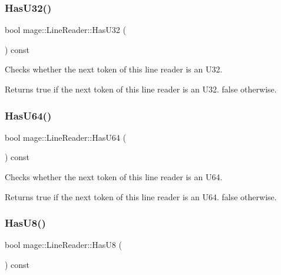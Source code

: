 \subsubsection{\texorpdfstring{Has\+U32()}{HasU32()}}
{\footnotesize\ttfamily bool mage\+::\+Line\+Reader\+::\+Has\+U32 (\begin{DoxyParamCaption}{ }\end{DoxyParamCaption}) const\hspace{0.3cm}{\ttfamily [protected]}}

Checks whether the next token of this line reader is an {\ttfamily U32}.

\begin{DoxyReturn}{Returns}
{\ttfamily true} if the next token of this line reader is an {\ttfamily U32}. {\ttfamily false} otherwise. 
\end{DoxyReturn}
\hypertarget{classmage_1_1_line_reader_a638e055df8a1850e2e5cb9c91f8c54fc}{}\label{classmage_1_1_line_reader_a638e055df8a1850e2e5cb9c91f8c54fc} 
\subsubsection{\texorpdfstring{Has\+U64()}{HasU64()}}
{\footnotesize\ttfamily bool mage\+::\+Line\+Reader\+::\+Has\+U64 (\begin{DoxyParamCaption}{ }\end{DoxyParamCaption}) const\hspace{0.3cm}{\ttfamily [protected]}}

Checks whether the next token of this line reader is an {\ttfamily U64}.

\begin{DoxyReturn}{Returns}
{\ttfamily true} if the next token of this line reader is an {\ttfamily U64}. {\ttfamily false} otherwise. 
\end{DoxyReturn}
\hypertarget{classmage_1_1_line_reader_a2366e6732f404890a54573fd009530aa}{}\label{classmage_1_1_line_reader_a2366e6732f404890a54573fd009530aa} 
\subsubsection{\texorpdfstring{Has\+U8()}{HasU8()}}
{\footnotesize\ttfamily bool mage\+::\+Line\+Reader\+::\+Has\+U8 (\begin{DoxyParamCaption}{ }\end{DoxyParamCaption}) const\hspace{0.3cm}{\ttfamily [protected]}}

